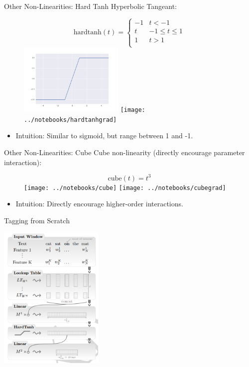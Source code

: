\documentclass{beamer}
\begin{document}
\begin{frame}{Other Non-Linearities: Hard Tanh}
  Hyperbolic Tangeant:
  \begin{figure}
    \centering
    \[\mathrm{hardtanh}(t) =
      \begin{cases}
        -1& t < -1 \\
        t & -1
\leq t \leq 1\\
        1 & t > 1\\
      \end{cases}
    \]
    \includegraphics[width=5cm]{../notebooks/hardtanh}
    \texttt{[image: ../notebooks/hardtanhgrad]}
  \end{figure}
  \begin{itemize}
  \item Intuition: Similar to sigmoid, but range between 1 and -1.
  \end{itemize}
\end{frame}


\begin{frame}{Other Non-Linearities: Cube}
  Cube non-linearity (directly encourage parameter interaction):
  \begin{figure}
    \centering
    \[\mathrm{cube}(t) = t^3  \]
    \texttt{[image: ../notebooks/cube]}
    \texttt{[image: ../notebooks/cubegrad]}
  \end{figure}
  \begin{itemize}
  \item Intuition: Directly encourage higher-order interactions.
  \end{itemize}
\end{frame}


\begin{frame}{Tagging from Scratch}
  \begin{center}
    \includegraphics[width=5cm]{cwfull}
  \end{center}
\end{frame}
\end{document}

